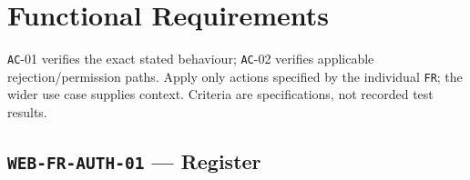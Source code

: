 \clearpage
\section{Functional Requirements}\label{sec:srs-9}
\texttt{AC}-01 verifies the exact stated behaviour; \texttt{AC}-02 verifies applicable rejection/\allowbreak{}permission paths. Apply only actions specified by the individual \texttt{FR}; the wider use case supplies context. Criteria are specifications, not recorded test results.

\subsection{\texttt{WEB-\allowbreak{}FR-\allowbreak{}AUTH-\allowbreak{}01} — Register}
\begingroup
\fontsize{9.5}{12}\selectfont
\setlength{\SRSWidth}{\dimexpr\linewidth-2\tabcolsep\relax}
